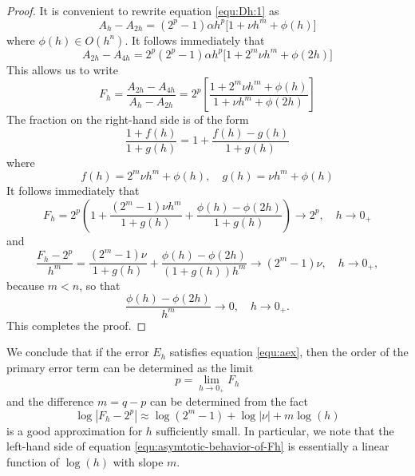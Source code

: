 \documentclass[runningheads]{llncs}
\begin{document}
\begin{proof} It is convenient to rewrite equation \eqref{equ:Dh:1} as
  \begin{equation}
    A_h - A_{2h} = (2^p-1) \alpha h^p \Big [ 1  + \nu h^m + \phi(h) \Big]
  \end{equation}
  where $\phi(h) \in O(h^n)$. It follows immediately that
   \begin{equation}
      A_{2h} - A_{4h} = 2^p (2^p-1) \alpha h^p \Big[ 1 + 2^m \nu h^m + \phi(2h) \Big]
  \end{equation}
  This allows us to write
  \begin{equation}
    F_h = \frac{ A_{2h} - A_{4h}}{ A_h - A_{2h}} = 2^p \left[ \frac{ 1 + 2^m \nu h^m + \phi(h)}{ 1  + \nu h^m + \phi(2h)} \right]
  \end{equation}
  The fraction on the right-hand side is of the form
  \begin{equation}
    \frac{1 + f(h)}{1 + g(h)} = 1 + \frac{f(h) - g(h)}{1 + g(h)}
  \end{equation}
  where
  \begin{equation}
    f(h) = 2^m \nu h^m + \phi(h), \quad g(h) = \nu h^m + \phi(h)
  \end{equation}
  It follows immediately that
  \begin{equation}
    F_h = 2^p \left( 1 + \frac{(2^m-1)\nu h^m}{1+g(h)} + \frac{\phi(h) - \phi(2h)}{1+g(h)}\right) \rightarrow 2^p, \quad h \rightarrow 0_+
  \end{equation}
  and
  \begin{equation}
    \frac{F_h - 2^p}{h^m}  = \frac{(2^m-1)\nu }{1+g(h)} + \frac{\phi(h) - \phi(2h)}{(1+g(h))h^m} \rightarrow (2^m - 1) \nu, \quad h \rightarrow 0_+,
  \end{equation}
  because $m < n$, so that
  \begin{equation}
     \frac{\phi(h) - \phi(2h)}{h^m} \rightarrow 0, \quad h \rightarrow 0_+.
  \end{equation}
  This completes the proof.
\end{proof}
We conclude that if the error $E_h$ satisfies equation \eqref{equ:aex}, then the order of the primary error term can be determined as the limit
\begin{equation}
p = \underset{h \rightarrow 0_+}{\lim} F_h
\end{equation}
and the difference $m = q-p$ can be determined from the fact
\begin{equation} \label{equ:asymtotic-behavior-of-Fh}
  \log |F_h - 2^p| \approx \log(2^m-1) + \log|\nu| + m \log(h)
\end{equation}
is a good approximation for $h$ sufficiently small. In particular, we note that the left-hand side of equation \ref{equ:asymtotic-behavior-of-Fh} is essentially a linear function of $\log(h)$ with slope $m$.
\end{document}
